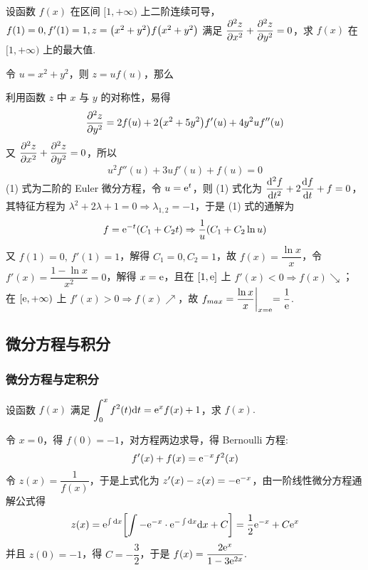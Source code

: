 \begin{example}
    设函数 $f(x)$ 在区间 $[1,+\infty)$ 上二阶连续可导，$f(1)=0,f'(1)=1,z=\qty(x^2+y^2)f\qty(x^2+y^2)$
    满足 $\displaystyle \pdv[2]{z}{x}+\pdv[2]{z}{y}=0$，求 $f(x)$ 在 $[1,+\infty)$ 上的最大值.
\end{example}
\begin{solution}
    令 $u=x^2+y^2$，则 $z=uf(u)$，那么
    利用函数 $z$ 中 $x$ 与 $y$ 的对称性，易得
    $$\pdv[2]{z}{y}=2f(u)+2\qty(x^2+5y^2)f'(u)+4y^2uf''(u)$$
    又 $\displaystyle \pdv[2]{z}{x}+\pdv[2]{z}{y}=0$，所以
    \begin{equation*}
        u^2f''(u)+3uf'(u)+f(u)=0
        \tag{1}
    \end{equation*}
    (1) 式为二阶的 Euler 微分方程，令 $u=\mathrm{e} ^t$，则
    (1) 式化为 $\displaystyle \dv[2]{f}{t}+2\dv{f}{t}+f=0$，其特征方程为 $\lambda^2+2\lambda+1=0\Rightarrow \lambda_{1,2}=-1$，于是 (1) 式的通解为
    $$f=\mathrm{e} ^{-t}(C_1+C_2t)\Rightarrow \dfrac{1}{u}(C_1+C_2\ln u)$$
    又 $f(1)=0,~f'(1)=1$，解得 $C_1=0,C_2=1$，故 $f(x)=\dfrac{\ln x}{x}$，令 $f'(x)=\dfrac{1-\ln x}{x^2}=0$，解得 $x=\mathrm{e} $，且在 $[1,\mathrm{e} ]$ 上 $f'(x)<0\Rightarrow f(x)\searrow$；
    在 $[\mathrm{e} ,+\infty)$ 上 $f'(x)>0\Rightarrow f(x)\nearrow$，故 $f_{max}=\dfrac{\ln x}{x}\biggl |_{x=\mathrm{e} }=\dfrac{1}{\mathrm{e} }$.
\end{solution}

\subsection{微分方程与积分}

\subsubsection{微分方程与定积分}

\begin{example}[2023 四川大学]
    设函数 $f(x)$ 满足 $\displaystyle\int_{0}^{x}f^2(t)\dd t=\mathrm{e} ^xf(x)+1$，求 $f(x).$
\end{example}
\begin{solution}
    令 $x=0$，得 $f(0)=-1$，对方程两边求导，得 Bernoulli 方程:
    $$f'(x)+f(x)=\mathrm{e} ^{-x}f^2(x)$$
    令 $z(x)=\dfrac{1}{f(x)}$，于是上式化为 $z'(x)-z(x)=-\mathrm{e} ^{-x}$，由一阶线性微分方程通解公式得
    $$z(x)=\mathrm{e} ^{\int\dd x}\qty[\int-\mathrm{e} ^{-x}\cdot\mathrm{e} ^{-\int\dd x}\dd x+C]=\dfrac{1}{2}\mathrm{e} ^{-x}+C\mathrm{e} ^x$$
    并且 $z(0)=-1$，得 $C=-\dfrac{3}{2}$，于是 $f(x)=\dfrac{2\mathrm{e} ^{x}}{1-3\mathrm{e} ^{2x}}.$
\end{solution}


